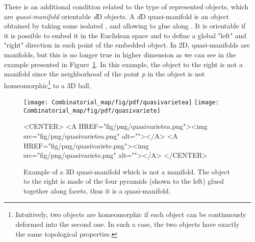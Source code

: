 There is an additional condition related to the type of represented
objects, which are \emph{quasi-manifold} orientable \emph{d}D objects.  A
\emph{d}D quasi-manifold is an object obtained by taking some isolated
, and allowing to glue  along . It is
orientable if it is possible to embed it in the Euclidean space and to
define a global "left" and "right" direction in each point of the
embedded object.  In 2D, quasi-manifolds are manifolds, but this is no
longer true in higher dimension as we can see in the example presented
in Figure~\ref{fig-quasivariete}.  In this example, the object to the
right is not a manifold since the neighborhood of the point \emph{p} in the
object is not homeomorphic\footnote{Intuitively, two objects are
  homeomorphic if each object can be continuously deformed into the
  second one.  In such a case, the two objects have exactly the same
  topological properties.}  to a 3D ball.
%
\begin{figure}
  \begin{ccTexOnly}
    \begin{center}
    \texttt{[image: Combinatorial\_map/fig/pdf/quasivarietea]}
    \texttt{[image: Combinatorial\_map/fig/pdf/quasivariete]}
    \end{center}
  \end{ccTexOnly}
  \begin{ccHtmlOnly}
    <CENTER>
    <A HREF="fig/png/quasivarietea.png"><img src="fig/png/quasivarietea.png" alt=""></A>
    <A HREF="fig/png/quasivariete.png"><img src="fig/png/quasivariete.png" alt=""></A>
    </CENTER>
  \end{ccHtmlOnly} 
  \caption{Example of a 3D quasi-manifold which is not a manifold.
    The object to the right is made of the four pyramids (shown to the
    left) glued together along facets, thus it is a quasi-manifold.}
  \label{fig-quasivariete}
\end{figure}

